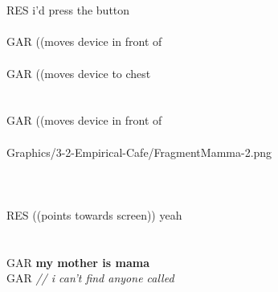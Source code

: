 \begin{inlinefrag*}
\begin{transcript*}
         \\
         \\
        \by RES {i'd press the button} \\
         \\
        \by GAR {((moves device in front of} \\
         \\
        \by GAR {((moves device to chest} \\
         \\
         \\
        \by GAR {((moves device in front of} \\
         \\
           {Graphics/3-2-Empirical-Cafe/FragmentMamma-2.png}
          \\
         \\
         \\
         \\
        \by RES {((points towards screen)) yeah} \\
         \\
         \\
        \by GAR {\textbf{my mother is mama}} \\
        \by GAR {\textit{// i can’t find anyone called}} \\
         \\
    \end{transcript*}
\end{inlinefrag*}

